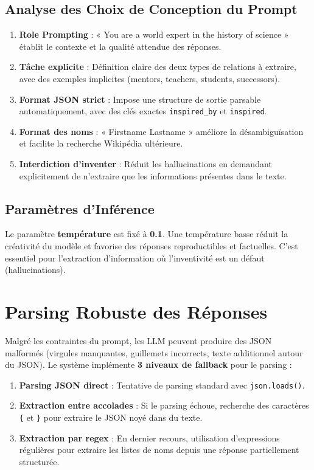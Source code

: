 \documentclass[12pt,a4paper]{report}
\begin{document}
\subsection{Analyse des Choix de Conception du Prompt}

\begin{enumerate}
    \item \textbf{Role Prompting} : « You are a world expert in the history of science » établit le contexte et la qualité attendue des réponses.

    \item \textbf{Tâche explicite} : Définition claire des deux types de relations à extraire, avec des exemples implicites (mentors, teachers, students, successors).

    \item \textbf{Format JSON strict} : Impose une structure de sortie parsable automatiquement, avec des clés exactes \texttt{inspired\_by} et \texttt{inspired}.

    \item \textbf{Format des noms} : « Firstname Lastname » améliore la désambiguïsation et facilite la recherche Wikipédia ultérieure.

    \item \textbf{Interdiction d'inventer} : Réduit les hallucinations en demandant explicitement de n'extraire que les informations présentes dans le texte.
\end{enumerate}

\subsection{Paramètres d'Inférence}

Le paramètre \textbf{température} est fixé à \textbf{0.1}. Une température basse réduit la créativité du modèle et favorise des réponses reproductibles et factuelles. C'est essentiel pour l'extraction d'information où l'inventivité est un défaut (hallucinations).

\section{Parsing Robuste des Réponses}

Malgré les contraintes du prompt, les LLM peuvent produire des JSON malformés (virgules manquantes, guillemets incorrects, texte additionnel autour du JSON). Le système implémente \textbf{3 niveaux de fallback} pour le parsing :

\begin{enumerate}
    \item \textbf{Parsing JSON direct} : Tentative de parsing standard avec \texttt{json.loads()}.
    \item \textbf{Extraction entre accolades} : Si le parsing échoue, recherche des caractères \texttt{\{} et \texttt{\}} pour extraire le JSON noyé dans du texte.
    \item \textbf{Extraction par regex} : En dernier recours, utilisation d'expressions régulières pour extraire les listes de noms depuis une réponse partiellement structurée.
\end{enumerate}
\end{document}
